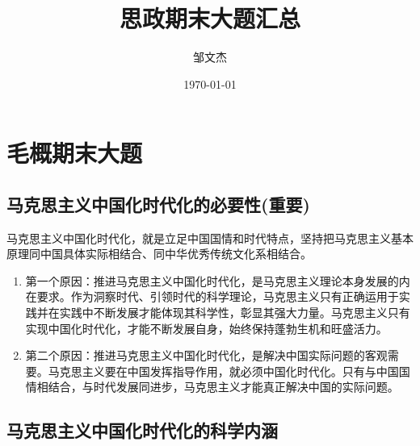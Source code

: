 \documentclass[12pt, a4paper, oneside]{ctexbook}
\title{{\Huge{\textbf{思政期末大题汇总}}}}
\author{邹文杰}
\date{\today}
\begin{document}
\maketitle

\setcounter{page}{1}




{}
\setcounter{page}{1}
\tableofcontents
\newpage
\setcounter{page}{1}

\chapter{毛概期末大题}

\section{马克思主义中国化时代化的必要性(重要)}

马克思主义中国化时代化，就是立足中国国情和时代特点，坚持把马克思主义基本原理同中国具体实际相结合、同中华优秀传统文化系相结合。

\begin{enumerate}[label=（\arabic*）]
\item 第一个原因：推进马克思主义中国化时代化，是马克思主义理论本身发展的内在要求。作为洞察时代、引领时代的科学理论，马克思主义只有正确运用于实践并在实践中不断发展才能体现其科学性，彰显其强大力量。马克思主义只有实现中国化时代化，才能不断发展自身，始终保持蓬勃生机和旺盛活力。
\item 第二个原因：推进马克思主义中国化时代化，是解决中国实际问题的客观需要。马克思主义要在中国发挥指导作用，就必须中国化时代化。只有与中国国情相结合，与时代发展同进步，马克思主义才能真正解决中国的实际问题。
\end{enumerate}

\section{马克思主义中国化时代化的科学内涵}
\end{document}
